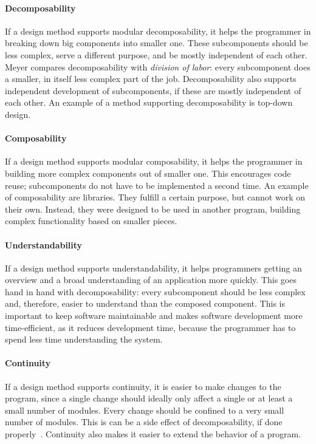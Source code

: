 \paragraph{Decomposability}
If a design method supports modular decomposability, it helps the programmer in breaking down big components into smaller one. These subcomponents should be less complex, serve a different purpose, and be mostly independent of each other. Meyer compares decomposability with \emph{division of labor}: every subcomponent does a smaller, in itself less complex part of the job. Decomposability also supports independent development of subcomponents, if these are mostly independent of each other. An example of a method supporting decomposability is top-down design.

\paragraph{Composability}
If a design method supports modular composability, it helps the programmer in building more complex components out of smaller one. This encourages code reuse; subcomponents do not have to be implemented a second time. An example of composability are libraries. They fulfill a certain purpose, but cannot work on their own. Instead, they were designed to be used in another program, building complex functionality based on smaller pieces.

\paragraph{Understandability}
If a design method supports understandability, it helps programmers getting an overview and a broad understanding of an application more quickly. This goes hand in hand with decomposability: every subcomponent should be less complex and, therefore, easier to understand than the composed component. This is important to keep software maintainable and makes software development more time-efficient, as it reduces development time, because the programmer has to spend less time understanding the system.

\paragraph{Continuity}
If a design method supports continuity, it is easier to make changes to the program, since a single change should ideally only affect a single or at least a small number of modules. Every change should be confined to a very small number of modules. This is can be a side effect of decomposability, if done properly~\cite{Parnas:1972:CUD:361598.361623}. Continuity also makes it easier to extend the behavior of a program.

